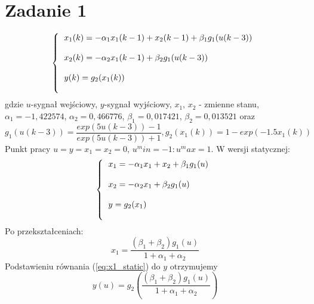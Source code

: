 \chapter{Zadanie 1}
	\label{ch:z1}
	\begin{equation}
	\left\{
	\begin{tabular}{l}
		$x_1(k)= - \alpha_1 x_1(k-1) + x_2(k-1) + \beta_1 g_1(u(k-3))$ \\\\
		$x_2(k)= - \alpha_2 x_1(k-1) + \beta_2 g_1(u(k-3))$\\\\
		$y(k)=g_2(x_1(k))$\\\\
	\end{tabular}
	\right.
	\label{eq:dyskretne}
	\end{equation}
	gdzie $u$-sygnał wejściowy, $y$-sygnał wyjściowy, $x_1$, $x_2$ - zmienne stanu, $\alpha_1 = -1,422574$, $\alpha_2 = 0,466776$, $\beta_1 = 0,017421$, $\beta_2 = 0,013521$ oraz
	\begin{equation}
		g_1(u(k-3))=\frac{exp(5u(k-3))-1}{exp(5u(k-3))+1}, g_2(x_1(k))=1-exp(-1.5x_1(k))
	\end{equation}
	Punkt pracy $u=y=x_1=x_2=0$, $u^min=-1 : u^max = 1$.
	W wersji statycznej:
	\begin{equation}
		\left\{
		\begin{tabular}{l}
		$x_1= - \alpha_1 x_1+x_2+ \beta_1 g_1(u)$ \\\\
		$x_2= - \alpha_2 x_1+ \beta_2 g_1(u)$\\\\
		$y=g_2(x_1)$\\\\
		\end{tabular}
		\right.
		\label{eq:statyczne}
	\end{equation}
	Po przekształceniach:
	\begin{equation}
		x_1 = \frac{(\beta_1 + \beta_2)g_1(u)}{1+\alpha_1+\alpha_2}
		\label{eq:x1_static}
	\end{equation}
	Podstawieniu równania (\ref{eq:x1_static}) do $y$ otrzymujemy
	\begin{equation}
		y(u) = g_2(\frac{(\beta_1 + \beta_2)g_1(u)}{1+\alpha_1+\alpha_2}
		\label{eq:x1_static})
	\end{equation}